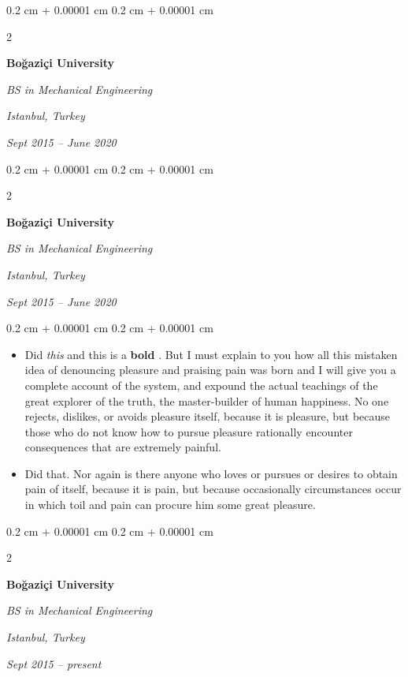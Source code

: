\documentclass[10pt, letterpaper]{article}
\newenvironment{highlights}{
    \begin{itemize}[
        topsep=0.10 cm,
        parsep=0.10 cm,
        partopsep=0pt,
        itemsep=0pt,
        leftmargin=0.4 cm + 10pt
    ]
}{
    \end{itemize}
} %
\newenvironment{onecolentry}{
    \begin{adjustwidth}{
        0.2 cm + 0.00001 cm
    }{
        0.2 cm + 0.00001 cm
    }
}{
    \end{adjustwidth}
} %
\newenvironment{twocolentry}[2][]{
    \onecolentry
    \def\secondColumn{#2}
    \setcolumnwidth{\fill, 4.5 cm}
    \begin{paracol}{2}
}{
    \switchcolumn \raggedleft \secondColumn
    \end{paracol}
    \endonecolentry
} %
\let\hrefWithoutArrow\href
\renewcommand{\href}[2]{\hrefWithoutArrow{#1}{\ifthenelse{\equal{#2}{}}{ }{#2 }\raisebox{.15ex}{\footnotesize \faExternalLink*}}}
\begin{document}
        \vspace{0.2 cm}

        \begin{twocolentry}{
        \textit{Istanbul, Turkey}    
            
        \textit{Sept 2015 – June 2020}}
            \textbf{Boğaziçi University}

            \textit{BS in Mechanical Engineering}
        \end{twocolentry}



        \vspace{0.2 cm}

        \begin{twocolentry}{
        \textit{Istanbul, Turkey}    
            
        \textit{Sept 2015 – June 2020}}
            \textbf{Boğaziçi University}

            \textit{BS in Mechanical Engineering}
        \end{twocolentry}

        \vspace{0.10 cm}
        \begin{onecolentry}
            \begin{highlights}
                \item Did \textit{this} and this is a \textbf{bold} \href{https://example.com}{link}. But I must explain to you how all this mistaken idea of denouncing pleasure and praising pain was born and I will give you a complete account of the system, and expound the actual teachings of the great explorer of the truth, the master-builder of human happiness. No one rejects, dislikes, or avoids pleasure itself, because it is pleasure, but because those who do not know how to pursue pleasure rationally encounter consequences that are extremely painful.
                \item Did that. Nor again is there anyone who loves or pursues or desires to obtain pain of itself, because it is pain, but because occasionally circumstances occur in which toil and pain can procure him some great pleasure.
            \end{highlights}
        \end{onecolentry}


        \vspace{0.2 cm}

        \begin{twocolentry}{
        \textit{Istanbul, Turkey}    
            
        \textit{Sept 2015 – present}}
            \textbf{Boğaziçi University}

            \textit{BS in Mechanical Engineering}
        \end{twocolentry}
\end{document}
